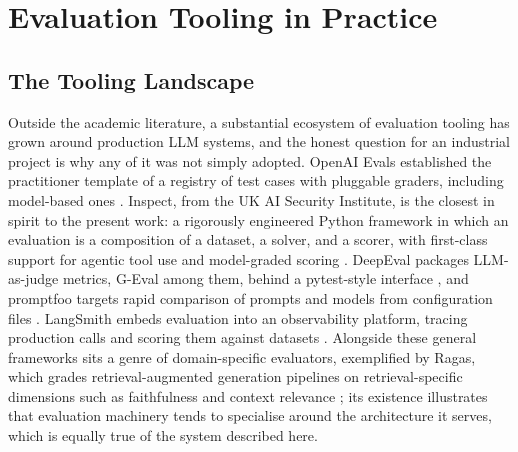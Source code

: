 \section{Evaluation Tooling in Practice}
\subsection{The Tooling Landscape}
Outside the academic literature, a substantial ecosystem of evaluation tooling has grown around production LLM systems, and the honest question for an industrial project is why any of it was not simply adopted. OpenAI Evals established the practitioner template of a registry of test cases with pluggable graders, including model-based ones \cite{openai2023evals}. Inspect, from the UK AI Security Institute, is the closest in spirit to the present work: a rigorously engineered Python framework in which an evaluation is a composition of a dataset, a solver, and a scorer, with first-class support for agentic tool use and model-graded scoring \cite{aisi2024inspect}. DeepEval packages LLM-as-judge metrics, G-Eval among them, behind a pytest-style interface \cite{confidentai2024deepeval}, and promptfoo targets rapid comparison of prompts and models from configuration files \cite{promptfoo2024}. LangSmith embeds evaluation into an observability platform, tracing production calls and scoring them against datasets \cite{langchain2024langsmith}. Alongside these general frameworks sits a genre of domain-specific evaluators, exemplified by Ragas, which grades retrieval-augmented generation pipelines on retrieval-specific dimensions such as faithfulness and context relevance \cite{es2024ragas}; its existence illustrates that evaluation machinery tends to specialise around the architecture it serves, which is equally true of the system described here.


